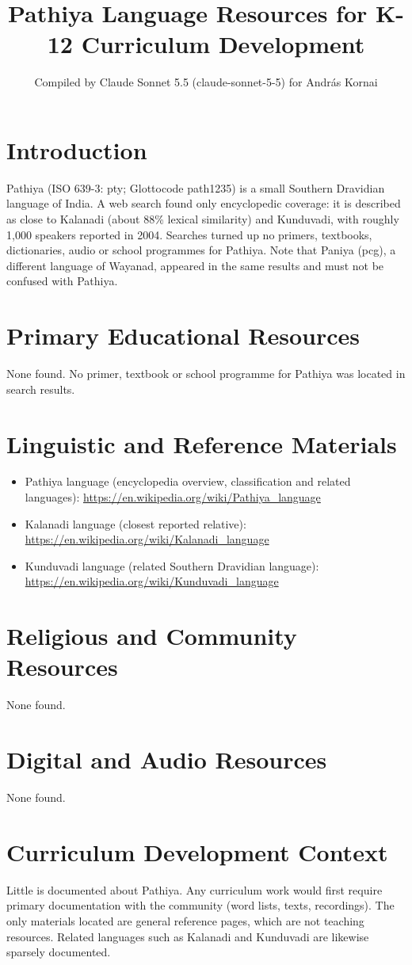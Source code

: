 \documentclass[12pt]{article}
\title{Pathiya Language Resources for K-12 Curriculum Development}
\author{Compiled by Claude Sonnet 5.5 (claude-sonnet-5-5) for Andr\'as Kornai}
\date{}
\begin{document}
\maketitle

\section{Introduction}
Pathiya (ISO 639-3: pty; Glottocode path1235) is a small Southern Dravidian language of India. A web search found only encyclopedic coverage: it is described as close to Kalanadi (about 88\% lexical similarity) and Kunduvadi, with roughly 1,000 speakers reported in 2004. Searches turned up no primers, textbooks, dictionaries, audio or school programmes for Pathiya. Note that Paniya (pcg), a different language of Wayanad, appeared in the same results and must not be confused with Pathiya.

\section{Primary Educational Resources}
None found. No primer, textbook or school programme for Pathiya was located in search results.

\section{Linguistic and Reference Materials}
\begin{itemize}
\item Pathiya language (encyclopedia overview, classification and related languages): \url{https://en.wikipedia.org/wiki/Pathiya_language}
\item Kalanadi language (closest reported relative): \url{https://en.wikipedia.org/wiki/Kalanadi_language}
\item Kunduvadi language (related Southern Dravidian language): \url{https://en.wikipedia.org/wiki/Kunduvadi_language}
\end{itemize}

\section{Religious and Community Resources}
None found.

\section{Digital and Audio Resources}
None found.

\section{Curriculum Development Context}
Little is documented about Pathiya. Any curriculum work would first require primary documentation with the community (word lists, texts, recordings). The only materials located are general reference pages, which are not teaching resources. Related languages such as Kalanadi and Kunduvadi are likewise sparsely documented.
\end{document}
